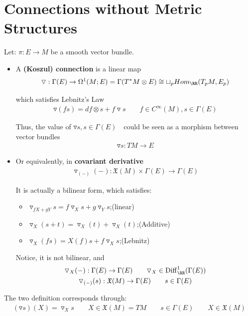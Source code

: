 \documentclass[Total.tex]{subfiles}
\begin{document}
			\section{Connections without Metric Structures}
		\begin{Def}
			Let: $\pi:E\rightarrow M$ be a smooth vector bundle. 
			\begin{itemize}
				\item 
				A \textbf{(Koszul) connection} is a linear map
				\begin{gather*}
					\triangledown:\Gamma(E)\rightarrow \Omega^1(M;E)=\Gamma(T^*M\otimes E)\cong \sqcup_p Hom_\RR (T_p M,E_p)
				\end{gather*}
				
				which satisfies Lebnitz's Law
				\begin{gather*}
					\triangledown(fs)=df\otimes s+f\triangledown s\qquad f\in C^\infty(M),s\in \Gamma(E)
				\end{gather*}
				
				Thus, the value of $\triangledown s,s\in \Gamma(E)$　could be seen as a morphism between vector bundles
				\begin{gather*}
					\triangledown s:TM\rightarrow E
				\end{gather*}
				\item Or equivalently, in \textbf{covariant derivative}
				\begin{gather*}
					\triangledown_{(-)}(-):\mathfrak{X}(M)\times \Gamma(E)\rightarrow \Gamma(E)
				\end{gather*}
				
				It is actually a bilinear form, which satisfies:
				\begin{itemize}
					\item $\triangledown_{fX+gY}s=f\triangledown_X s+g\triangledown_Y s$;(linear)
					\item $\triangledown_X(s+t)=\triangledown_X(t)+\triangledown_X(t)$;(Additive)
					\item $\triangledown_X(fs)=X(f)s+f\triangledown_X s$;(Lebnitz)
				\end{itemize}
				
				Notice, it is not bilinear, and
				\begin{gather*}
					\triangledown_X(-):\Gamma(E)\rightarrow \Gamma(E)\qquad \triangledown_X\in \operatorname{Diff}^1_\RR(\Gamma(E))\\
					\triangledown_{(-)}(s):\mathfrak{X}(M)\rightarrow \Gamma(E)\qquad s\in \Gamma(E)
				\end{gather*}
			\end{itemize}
			
			The two definition corresponds through:
			\begin{gather*}
				(\triangledown s)(X)=\triangledown_X s\qquad X\in \mathfrak{X}(M)=TM\qquad s\in \Gamma(E)\qquad X\in \mathfrak{X}(M)
			\end{gather*}
			
			\end{Def}
		
\end{document}
